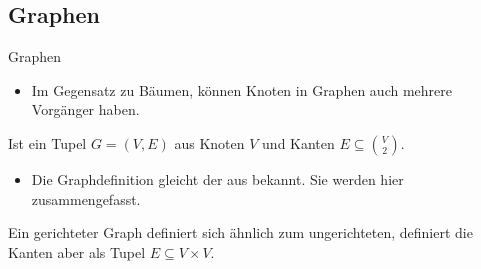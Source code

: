\subsection{Graphen}
\begin{frame}{Graphen}
    \begin{itemize}[<+(1)->]
        \item Im Gegensatz zu Bäumen, können Knoten in Graphen auch mehrere Vorgänger haben.
    \end{itemize}
    \pause{}
    \begin{definition}
        Ist ein Tupel \(G = (V,E)\) aus Knoten \(V\) und Kanten \(E \subseteq \binom{V}{2}\).
    \end{definition}
    \begin{itemize}[<+(1)->]
        \item Die Graphdefinition gleicht der aus  bekannt. Sie werden hier zusammengefasst.
    \end{itemize}
    \pause{}
    \begin{definition}
        Ein gerichteter Graph definiert sich ähnlich zum ungerichteten, definiert die Kanten aber als Tupel \(E \subseteq V \times V\).
    \end{definition}
\end{frame}

\def\basegraph{%
    \node[ball,gray] (0) at (0,0) {};
    \node[ball,gray] (1) at (1,1.125) {};
    \node[ball,gray] (2) at (1,-1.125) {};
    \node[ball,gray] (3) at (2.5,1.125) {};
    \node[ball,gray] (4) at (2.5,-1.125) {};
    \node[ball,gray] (5) at (3.75,0) {};
}

